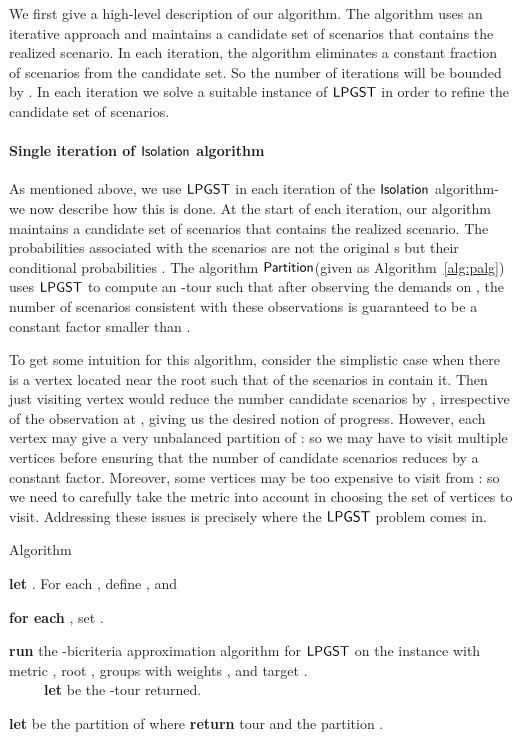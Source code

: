 \documentclass[11pt]{article}
\def\palg{\ensuremath{{\sf Partition}}\xspace}
\def\isoprob{\ensuremath{{\sf Isolation}}\xspace}
\def\lpgst{\ensuremath{{\sf LPGST}}\xspace}
\begin{document}
We first give a high-level description of our algorithm. The algorithm uses an iterative 
approach and maintains a
candidate set of scenarios that contains the realized scenario. In each iteration, the algorithm eliminates a constant fraction of scenarios from the candidate set. So the number of iterations will be bounded by . In each iteration we solve a suitable instance of \lpgst in order to refine the candidate set of scenarios. 


\paragraph{Single iteration of \isoprob algorithm} As mentioned above, we use \lpgst in each iteration of 
the \isoprob algorithm- we now describe how this is done.
 At the start of each iteration, our algorithm maintains a candidate set  of scenarios that contains the realized scenario.
The probabilities associated with the scenarios  are not the original s but their conditional probabilities . The algorithm \palg (given as Algorithm~\ref{alg:palg}) uses \lpgst to compute an -tour  such that after
observing the demands on , the number of scenarios consistent with these observations is guaranteed to be  a constant factor smaller than . 


To get some intuition for this algorithm, consider the simplistic case when there is a vertex  located near the root  such that  of the scenarios in  contain it. Then just 
visiting vertex  would reduce the number candidate scenarios by , irrespective of the observation at ,
giving us the desired notion of progress. However, each vertex may give a very unbalanced partition of : so we may have to visit multiple vertices before ensuring that the number of candidate scenarios reduces by a constant factor. Moreover, some vertices may
be  too expensive to visit from : so we need to carefully take the metric into account in choosing the set of vertices to visit. Addressing these issues is precisely where the \lpgst problem comes in.


\begin{algorithm}
  \caption{Algorithm }
  \label{alg:palg}
  \begin{algorithmic}[1]
    \STATE \label{step:palg0} \textbf{let} . For each ,
    define , and
    {\small }

    \STATE \label{step:palg-flip}
    \textbf{for each} , set .

    \STATE\label{step:palg1} \textbf{run} the -bicriteria approximation algorithm for \lpgst on the instance 
  with metric , root , groups
     with weights , and target
    . \\
    ~~~~~\textbf{let}  be the -tour
    returned.

    \STATE \label{step:palg2} \textbf{let}  be the
    partition of  where
    {\small }
    \STATE \textbf{return} tour  and the partition
    .
  \end{algorithmic}
\end{algorithm}
\end{document}

